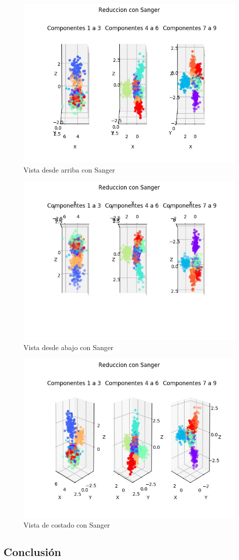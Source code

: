 \begin{figure}[H]
  \includegraphics[width=125mm]{imagenes/reduccion_Sanger_1.jpg}
  \caption{Vista desde arriba con Sanger}
\end{figure}

\begin{figure}[H]
  \includegraphics[width=125mm]{imagenes/reduccion_Sanger_2.jpg}
  \caption{Vista desde abajo con Sanger}
\end{figure}

\begin{figure}[H]
  \includegraphics[width=125mm]{imagenes/reduccion_Sanger_3.jpg}
  \caption{Vista de costado con Sanger}
\end{figure}

\subsection{Conclusión}

\newpage
